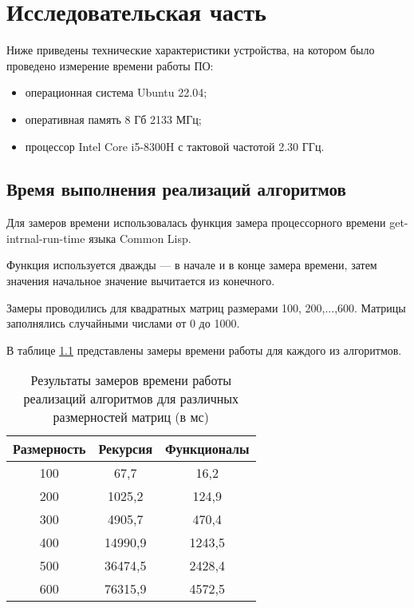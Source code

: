 \chapter{Исследовательская часть}


Ниже приведены технические характеристики устройства, на котором было проведено измерение времени работы ПО:

\begin{itemize}
	\item операционная система Ubuntu 22.04;
	\item оперативная память 8 Гб 2133 МГц;
	\item процессор Intel Core i5-8300H с тактовой частотой 2.30 ГГц.
\end{itemize}

\section{Время выполнения реализаций алгоритмов}

Для замеров времени использовалась функция замера процессорного времени get-intrnal-run-time языка Common Lisp.

Функция используется дважды --- в начале и в конце замера времени, затем значения начальное значение вычитается из конечного.

Замеры проводились для квадратных матриц размерами {100, 200,...,600}.
Матрицы заполнялись случайными числами от 0 до 1000.

В таблице \ref{tbl:even} представлены замеры времени работы для каждого из алгоритмов.

\begin{table}[h]
	\centering
	\caption{Результаты замеров времени работы реализаций алгоритмов для различных размерностей матриц (в мс)}
	\label{tbl:even}
	\begin{tabular}{|c| c |c|}
	\hline
	Размерность & Рекурсия & Функционалы\\
	\hline
	100 & 67,7 &16,2\\
	\hline
	200 & 1025,2 &124,9\\
	\hline
	300 & 4905,7&470,4\\
	\hline
	400 & 14990,9&1243,5\\
	\hline
	500 & 36474,5&2428,4\\
	\hline
	600 & 76315,9&4572,5\\
	\hline
	
	\end{tabular}
	
\end{table}

